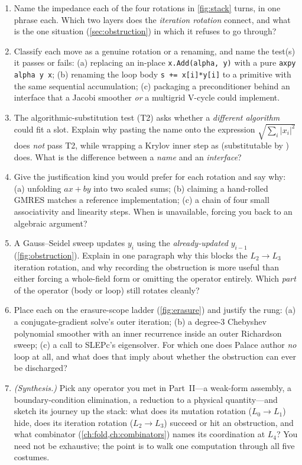 \exercisessection
\begin{enumerate}[nosep]
  \item Name the impedance each of the four rotations in \cref{fig:stack} turns,
  in one phrase each. Which two layers does the \emph{iteration rotation} connect,
  and what is the one situation (\cref{sec:obstruction}) in which it refuses to go
  through?
  \item Classify each move as a genuine rotation or a renaming, and name the
  test(s) it passes or fails: (a) replacing an in-place
  \lstinline[style=l4style]|x.Add(alpha, y)| with a pure
  \lstinline[style=l4style]|axpy alpha y x|; (b) renaming the loop body
  \lstinline[style=l4style]|s += x[i]*y[i]| to a primitive  with the same
  sequential accumulation; (c) packaging a preconditioner behind an 
  interface that a Jacobi smoother \emph{or} a multigrid V-cycle could implement.
  \item The algorithmic-substitution test (T2) asks whether a \emph{different
  algorithm} could fit a slot. Explain why pasting the name  onto the
  expression $\sqrt{\sum_i |x_i|^2}$ does \emph{not} pass T2, while wrapping a
  Krylov inner step as  (substitutable by )
  does. What is the difference between a \emph{name} and an \emph{interface}?
  \item Give the justification kind you would prefer for each rotation and say why:
  (a) unfolding $a x + b y$ into two scaled sums; (b) claiming a hand-rolled GMRES
  matches a reference implementation; (c) a chain of four small associativity and
  linearity steps. When is  unavailable, forcing you back to
  an algebraic argument?
  \item A Gauss--Seidel sweep updates $y_i$ using the \emph{already-updated}
  $y_{i-1}$ (\cref{fig:obstruction}). Explain in one paragraph why this blocks the
  $L_2 \to L_3$ iteration rotation, and why recording the obstruction is more
  useful than either forcing a whole-field form or omitting the operator entirely.
  Which \emph{part} of the operator (body or loop) still rotates cleanly?
  \item Place each on the erasure-scope ladder (\cref{fig:erasure}) and justify the
  rung: (a) a conjugate-gradient solve's outer iteration; (b) a degree-3 Chebyshev
  polynomial smoother with an inner recurrence inside an outer Richardson sweep;
  (c) a call to SLEPc's eigensolver. For which one does Palace author \emph{no}
  loop at all, and what does that imply about whether the obstruction can ever be
  discharged?
  \item \emph{(Synthesis.)} Pick any operator you met in Part~II---a weak-form
  assembly, a boundary-condition elimination, a reduction to a physical
  quantity---and sketch its journey up the stack: what does its mutation rotation
  ($L_0\!\to\!L_1$) hide, does its iteration rotation ($L_2\!\to\!L_3$) succeed or
  hit an obstruction, and what combinator (\cref{ch:fold,ch:combinators}) names its
  coordination at $L_4$? You need not be exhaustive; the point is to walk one
  computation through all five costumes.
\end{enumerate}
